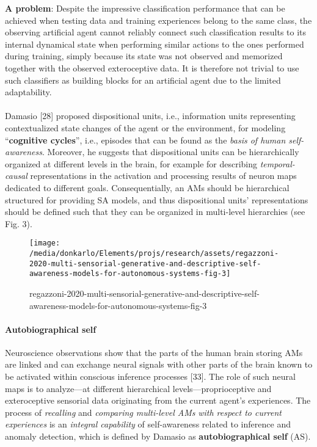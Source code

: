 \documentclass{article}
\begin{document}
			\textbf{A problem}: Despite the impressive classification performance that can be
			achieved when testing data and training experiences belong to
			the same class, the observing artificial agent cannot reliably
			connect such classification results to its internal dynamical
			state when performing similar actions to the ones performed
			during training, simply because its state was not observed and
			memorized together with the observed exteroceptive data. It is therefore not trivial to use such classifiers as building blocks for an artificial agent due to the limited adaptability. 
			
			\paragraph{} Damasio [28] proposed dispositional units, i.e., information units representing contextualized state changes of the
			agent or the environment, for modeling “\textbf{cognitive cycles}”,
			i.e., episodes that can be found as the \emph{basis of human self-awareness}. Moreover, he suggests that dispositional units can
			be hierarchically organized at different levels in the brain, for
			example for describing \emph{temporal-causal} representations in the
			activation and processing results of neuron maps dedicated to
			different goals. Consequentially, an AMs should be hierarchical structured for providing SA models, and thus dispositional
			units’ representations should be defined such that they can be organized in multi-level hierarchies (see Fig. 3).
			\begin{figure*}
				\centering
				\texttt{[image: /media/donkarlo/Elements/projs/research/assets/regazzoni-2020-multi-sensorial-generative-and-descriptive-self-awareness-models-for-autonomous-systems-fig-3]}
				\caption{regazzoni-2020-multi-sensorial-generative-and-descriptive-self-awareness-models-for-autonomous-systems-fig-3}
				\label{fig:regazzoni-2020-multi-sensorial-generative-and-descriptive-self-awareness-models-for-autonomous-systems-fig-3.png}
			\end{figure*}
			
			\paragraph{Autobiographical self} Neuroscience observations show that the parts of the human
			brain storing AMs are linked and can exchange neural signals
			with other parts of the brain known to be activated within conscious inference processes [33]. The role of such neural maps
			is to analyze—at different hierarchical levels—proprioceptive
			and exteroceptive sensorial data originating from the current
			agent’s experiences. The process of \emph{recalling} and \emph{comparing
			multi-level AMs}\emph{ with respect to current experiences} is an
		\emph{integral capability} of self-awareness related to inference and
			anomaly detection, which is defined by Damasio as \textbf{autobiographical self} (AS).
\end{document}
